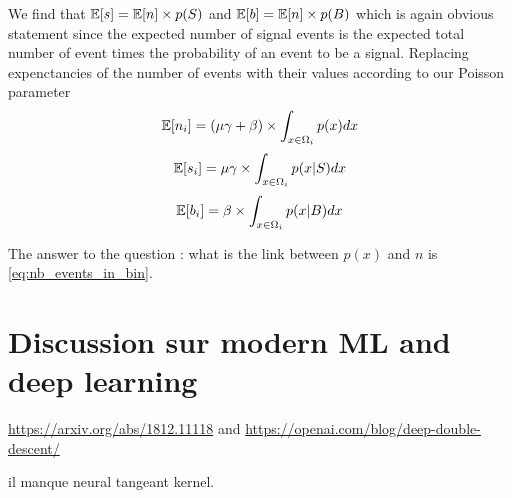 We find that $\mathbb{E}[s] = \mathbb{E}[n] \times p(S)$ and $\mathbb{E}[b] = \mathbb{E}[n] \times p(B)$ which is again obvious statement since the expected number of signal events is the expected total number of event times the probability of an event to be a signal.
Replacing expenctancies of the number of events with their values according to our Poisson parameter
\begin{equation}
	\mathbb{E}[n_i] = (\mu\gamma + \beta) \times \int_{x \in \Omega_i} p(x) dx
\end{equation}
\begin{equation}
	\mathbb{E}[s_i] = \mu\gamma \times \int_{x \in \Omega_i} p(x|S) dx
\end{equation}
\begin{equation}
	\mathbb{E}[b_i] = \beta \times \int_{x \in \Omega_i} p(x|B) dx
\end{equation}

The answer to the question : what is the link between $p(x)$ and $n$ is \autoref{eq:nb_events_in_bin}.





\section{Discussion sur modern ML and deep learning} %
\label{sec:discussion_sur_modern_ml_and_deep_learning}


\url{https://arxiv.org/abs/1812.11118} and 
\url{https://openai.com/blog/deep-double-descent/}

il manque neural tangeant kernel.




